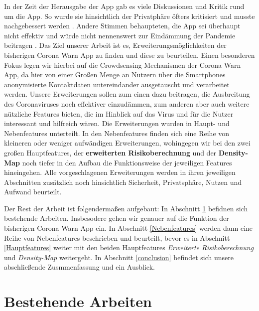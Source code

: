 \documentclass[conference]{IEEEtran}
\begin{document}
In der Zeit der Herausgabe der App gab es viele Diskussionen und Kritik rund um die App. So wurde sie hinsichtlich der Privatphäre öfters kritisiert und musste nachgebessert werden \cite{}. 
Andere Stimmen behaupteten, die App sei überhaupt nicht effektiv und würde nicht nennenswert zur Eindämmung der Pandemie beitragen \cite{}. 
Das Ziel unserer Arbeit ist es, Erweiterungsmöglichkeiten der bisherigen Corona Warn App zu finden und diese zu beurteilen. 
Einen besonderen Fokus legen wir hierbei auf die Crowdsensing Mechanismen der Corona Warn App, da hier von einer Großen Menge an Nutzern über die Smartphones anonymisierte Kontaktdaten untereindander ausgetauscht und verarbeitet werden.
Unsere Erweiterungen sollen zum einen dazu beitragen, die Ausbreitung des Coronaviruses noch effektiver einzudämmen, zum anderen aber auch weitere nützliche Features bieten, die im Hinblick auf das Virus und für die Nutzer interessant und hilfreich wären.
Die Erweiterungen wurden in Haupt- und Nebenfeatures unterteilt. In den Nebenfeatures finden sich eine Reihe von kleineren oder weniger aufwändigen Erweiterungen, wohingegen wir bei den zwei großen Hauptfeatures, der \textbf{erweiterten Risikoberechnung} und der \textbf{Density-Map} noch tiefer in den Aufbau die Funktionsweise der jeweiligen Features hineingehen.
Alle vorgeschlagenen Erweiterungen werden in ihren jeweiligen Abschnitten zusätzlich noch hinsichtlich Sicherheit, Privatsphäre, Nutzen und Aufwand beurteilt. 

Der Rest der Arbeit ist folgendermaßen aufgebaut: In Abschnitt \ref{rel_work} befidnen sich bestehende Arbeiten. Insbesodere gehen wir genauer auf die Funktion der bisherigen Corona Warn App ein. 
In Abschnitt \ref{Nebenfeatures} werden dann eine Reihe von Nebenfeatures beschrieben und beurteilt, bevor es in Abschnitt \ref{Hauptfeatures} weiter mit den beiden Hauptfeatures \textit{Erweiterte Risikoberechnung} und \textit{Density-Map} weitergeht. 
In Abschnitt \ref{conclusion} befindet sich unsere abschließende Zusmmenfassung und ein Ausblick. 

\section{Bestehende Arbeiten} \label{rel_work}
\end{document}
